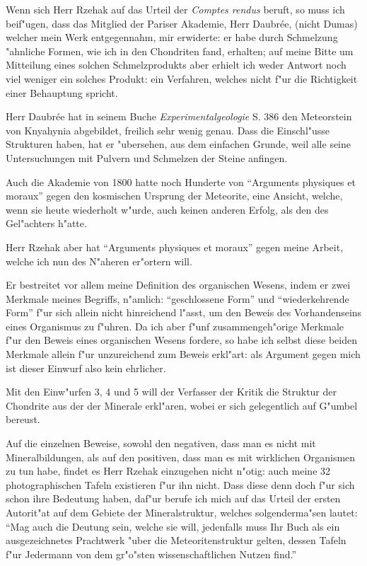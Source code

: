\documentclass[a4paper, 12pt, oneside]{article}
\begin{document}
Wenn sich Herr Rzehak auf das Urteil der \emph{Comptes rendus} beruft, so muss ich beif"ugen, dass das Mitglied der Pariser Akademie, Herr Daubrée, (nicht Dumas) welcher mein Werk entgegennahm, mir erwiderte: er habe durch Schmelzung "ahnliche Formen, wie ich in den Chondriten fand, erhalten; auf meine Bitte um Mitteilung eines solchen Schmelzprodukts aber erhielt ich weder Antwort noch viel weniger ein solches Produkt: ein Verfahren, welches nicht f"ur die Richtigkeit einer Behauptung spricht.

Herr Daubrée hat in seinem Buche \emph{Experimentalgeologie} S. 386 den Meteorstein von Knyahynia abgebildet, freilich sehr wenig genau. Dass die Einschl"usse Strukturen haben, hat er "ubersehen, aus dem einfachen Grunde, weil alle seine Untersuchungen mit Pulvern und Schmelzen der Steine anfingen.

Auch die Akademie von 1800 hatte noch Hunderte von "`Arguments physiques et moraux"' gegen den kosmischen Ursprung der Meteorite, eine Ansicht, welche, wenn sie heute wiederholt w"urde, auch keinen anderen Erfolg, als den des Gel"achters h"atte.

Herr Rzehak aber hat "`Arguments physiques et moraux"' gegen meine Arbeit, welche ich nun des N"aheren er"ortern will.

Er bestreitet vor allem meine Definition des organischen Wesens, indem er zwei Merkmale meines Begriffs, n"amlich: "`geschlossene Form"' und "`wiederkehrende Form"' f"ur sich allein nicht hinreichend l"asst, um den Beweis des Vorhandenseins eines Organismus zu f"uhren. Da ich aber f"unf zusammengeh"orige Merkmale f"ur den Beweis eines organischen Wesens fordere, so habe ich selbst diese beiden Merkmale allein f"ur unzureichend zum Beweis erkl"art: als Argument gegen mich ist dieser Einwurf also kein ehrlicher.

Mit den Einw"urfen 3, 4 und 5 will der Verfasser der Kritik die Struktur der Chondrite aus der der Minerale erkl"aren, wobei er sich gelegentlich auf G"umbel bereust.

Auf die einzelnen Beweise, sowohl den negativen, dass man es nicht mit Mineralbildungen, als auf den positiven, dass man es mit wirklichen Organismen zu tun habe, findet es Herr Rzehak einzugehen nicht n"otig: auch meine 32 photographischen Tafeln existieren f"ur ihn nicht. Dass diese denn doch f"ur sich schon ihre Bedeutung haben, daf"ur berufe ich mich auf das Urteil der ersten Autorit"at auf dem Gebiete der Mineralstruktur, welches solgenderma"sen lautet: "`Mag auch die Deutung sein, welche sie will, jedenfalls muss Ihr Buch als ein ausgezeichnetes Prachtwerk "uber die Meteoritenstruktur gelten, dessen Tafeln f"ur Jedermann von dem gr"o"sten wissenschaftlichen Nutzen find."'
\end{document}
